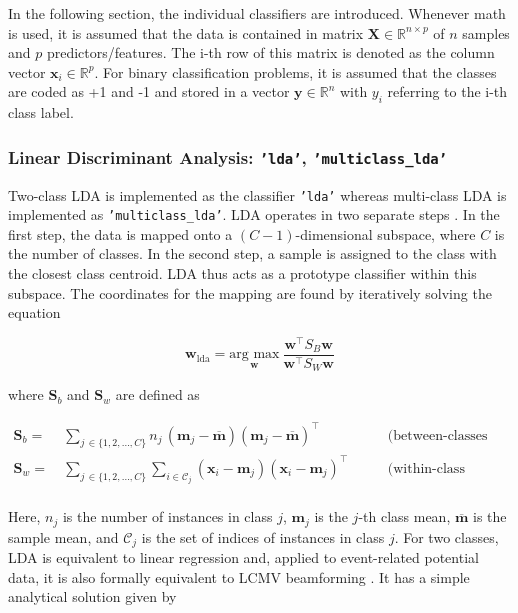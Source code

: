 \documentclass[utf8]{frontiersSCNS} %
\newcommand{\m}{\mathbf{m}}
\newcommand{\mbar}{\overline{\m}}
\newcommand{\mm}[1]{\m_{#1}}
\newcommand{\w}{\mathbf{w}}
\newcommand{\x}{\mathbf{x}}
\newcommand{\R}{\mathbb{R}}
\renewcommand{\S}{\mathbf{S}}
\newcommand{\X}{\mathbf{X}}
\newcommand{\ttt}[1]{\texttt{#1}}
\begin{document}
In the following section, the individual classifiers are introduced. Whenever math is used, it is assumed that the data is contained in matrix $\X\in\R^{n \times p}$ of $n$ samples and $p$ predictors/features. The i-th row of this matrix is denoted as the column vector $\x_i\in\R^p$. For binary classification problems, it is assumed that the classes are coded as +1 and -1 and stored in a vector $\mathbf{y}\in\R^n$ with $y_i$ referring to the i-th class label.

\subsubsection{Linear Discriminant Analysis: \ttt{'lda'}, \ttt{'multiclass\_lda'}}

Two-class LDA is implemented as the classifier \ttt{'lda'} whereas multi-class LDA is implemented as \texttt{'multiclass\_lda'}. LDA operates in two separate steps \citep{Fisher1936}. In the first step, the data is mapped onto a $(C-1)$-dimensional subspace, where $C$ is the number of classes. In the second step, a sample is assigned to the class with the closest class centroid. LDA thus acts as a prototype classifier within this subspace. The coordinates for the mapping are found by iteratively solving the equation

\begin{equation}
\label{eq:fda}
\w_{\text{lda}} = \underset{\w}{\text{arg max}}\ \frac{\w^\top S_B\w}{\w^\top S_W\w}
\end{equation}

where $\S_b$ and $\S_w$ are defined as

\begin{equation*}
\begin{alignedat}{2}
\S_b =\ & \sum_{j\,\in\{1,2,...,C\}}n_j\,(\mm{j} -\mbar) (\mm{j} - \mbar)^\top\ \quad &&\text{(between-classes scatter)}\\
\S_w =\ & \sum_{j\,\in\{1,2,...,C\}}\sum_{i\in\mathcal{C}_j} (\x_i - \mm{j})(\x_i - \mm{j})^\top\  \quad &&\text{(within-class scatter)}\\
\end{alignedat}
\end{equation*}

Here, $n_j$ is the number of instances in class $j$, $\m_j$ is the $j$-th class mean, $\mbar$ is the sample mean, and $\mathcal{C}_j$ is the set of indices of instances in class $j$. For two classes, LDA is equivalent to linear regression \citep{Treder2019DirectFDA} and, applied to event-related potential data, it is also formally equivalent to LCMV beamforming \citep{Treder2016}. It has a simple analytical solution given by
\end{document}
